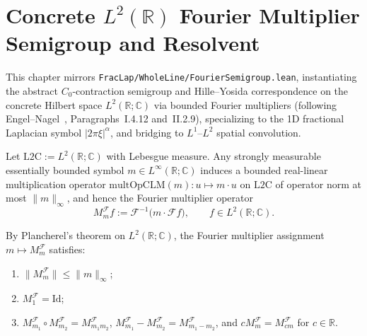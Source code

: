 \chapter{Concrete $L^2(\mathbb{R})$ Fourier Multiplier Semigroup and Resolvent}

This chapter mirrors \texttt{FracLap/WholeLine/FourierSemigroup.lean}, instantiating the abstract $C_0$-contraction semigroup and Hille--Yosida correspondence on the concrete Hilbert space $L^2(\mathbb{R}; \mathbb{C})$ via bounded Fourier multipliers (following Engel--Nagel~\cite{engel}, Paragraphs~I.4.12 and~II.2.9), specializing to the 1D fractional Laplacian symbol $\lvert 2\pi\xi \rvert^\alpha$, and bridging to $L^1$--$L^2$ spatial convolution.

\begin{definition}\label{def:fourier_multiplier_op}
\leanok
Let $\mathrm{L2C} := L^2(\mathbb{R}; \mathbb{C})$ with Lebesgue measure. Any strongly measurable essentially bounded symbol $m \in L^\infty(\mathbb{R}; \mathbb{C})$ induces a bounded real-linear multiplication operator $\mathrm{multOpCLM}(m) : u \mapsto m \cdot u$ on $\mathrm{L2C}$ of operator norm at most $\lVert m \rVert_\infty$, and hence the Fourier multiplier operator
\[
  M_m^{\mathcal{F}} f := \mathcal{F}^{-1}\bigl(m \cdot \mathcal{F} f\bigr), \qquad f \in L^2(\mathbb{R}; \mathbb{C}).
\]
\end{definition}

\begin{lemma}\label{lem:fourier_multiplier_algebra}
\leanok
By Plancherel's theorem on $L^2(\mathbb{R}; \mathbb{C})$, the Fourier multiplier assignment $m \mapsto M_m^{\mathcal{F}}$ satisfies:
\begin{enumerate}
  \item $\lVert M_m^{\mathcal{F}} \rVert \le \lVert m \rVert_\infty$;
  \item $M_1^{\mathcal{F}} = \mathrm{Id}$;
  \item $M_{m_1}^{\mathcal{F}} \circ M_{m_2}^{\mathcal{F}} = M_{m_1 m_2}^{\mathcal{F}}$, $M_{m_1}^{\mathcal{F}} - M_{m_2}^{\mathcal{F}} = M_{m_1 - m_2}^{\mathcal{F}}$, and $c M_m^{\mathcal{F}} = M_{c m}^{\mathcal{F}}$ for $c \in \mathbb{R}$.
\end{enumerate}
\end{lemma}

